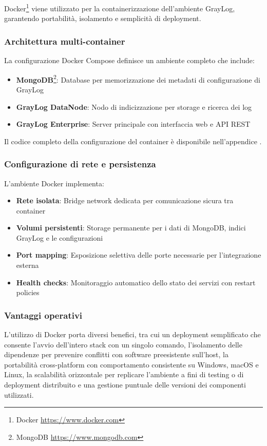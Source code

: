 \documentclass[12pt]{report}
\begin{document}
Docker\footnote{Docker \url{https://www.docker.com}} viene utilizzato per la containerizzazione dell'ambiente GrayLog, garantendo portabilità, isolamento e semplicità di deployment.

\subsubsection{Architettura multi-container}
La configurazione Docker Compose definisce un ambiente completo che include:

\begin{itemize}
    \item \textbf{MongoDB}\footnote{MongoDB \url{https://www.mongodb.com}}: Database per memorizzazione dei metadati di configurazione di GrayLog
    \item \textbf{GrayLog DataNode}: Nodo di indicizzazione per storage e ricerca dei log
    \item \textbf{GrayLog Enterprise}: Server principale con interfaccia web e API REST
\end{itemize}

Il codice completo della configurazione del container è disponibile nell'appendice .

\subsubsection{Configurazione di rete e persistenza}
L'ambiente Docker implementa:

\begin{itemize}
    \item \textbf{Rete isolata}: Bridge network dedicata per comunicazione sicura tra container
    \item \textbf{Volumi persistenti}: Storage permanente per i dati di MongoDB, indici GrayLog e le configurazioni
    \item \textbf{Port mapping}: Esposizione selettiva delle porte necessarie per l'integrazione esterna
    \item \textbf{Health checks}: Monitoraggio automatico dello stato dei servizi con restart policies
\end{itemize}

\subsubsection{Vantaggi operativi}
L'utilizzo di Docker porta diversi benefici, tra cui un deployment semplificato che consente l'avvio dell'intero stack con un singolo comando, l'isolamento delle dipendenze per prevenire conflitti con software preesistente sull'host, la portabilità cross-platform con comportamento consistente su Windows, macOS e Linux, la scalabilità orizzontale per replicare l'ambiente a fini di testing o di deployment distribuito e una gestione puntuale delle versioni dei componenti utilizzati.
\end{document}
